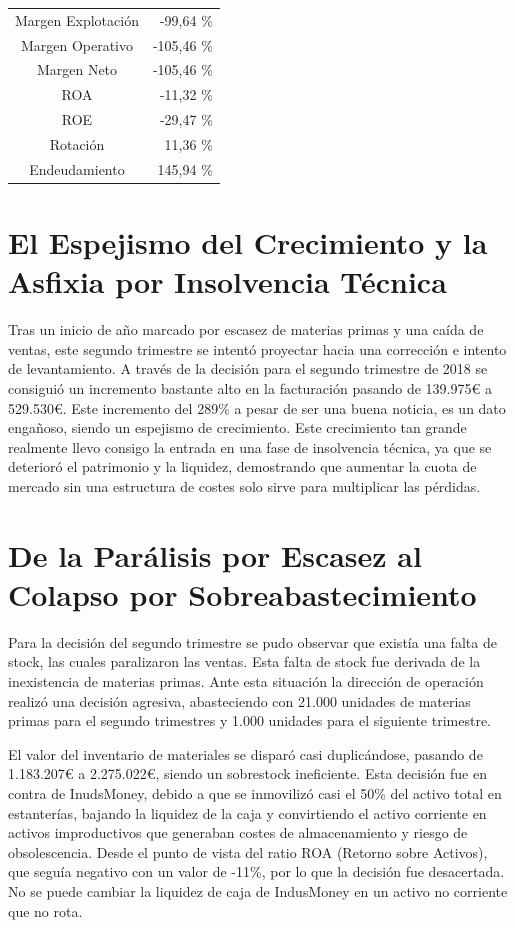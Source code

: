 \begin{table}[h]
    \centering
    \begin{tabular}{|c|r|}
        \hline
        Margen Explotación  & -99,64 \% \\
        Margen Operativo    & -105,46 \% \\
        Margen Neto         & -105,46 \% \\
        ROA                 & -11,32 \% \\
        ROE                 & -29,47 \% \\
        Rotación            & 11,36 \% \\
        Endeudamiento       & 145,94 \% \\
        \hline
    \end{tabular}
\end{table}

\section*{El Espejismo del Crecimiento y la Asfixia por Insolvencia Técnica}
Tras un inicio de año marcado por escasez de materias primas y una caída de ventas, este segundo trimestre se intentó proyectar hacia una corrección e intento de levantamiento. A través de la decisión para el segundo trimestre de 2018 se consiguió un incremento bastante alto en la facturación pasando de 139.975€ a 529.530€. Este incremento del 289\% a pesar de ser una buena noticia, es un dato engañoso, siendo un espejismo de crecimiento. Este crecimiento tan grande realmente llevo consigo la entrada en una fase de insolvencia técnica, ya que se deterioró el patrimonio y la liquidez, demostrando que aumentar la cuota de mercado sin una estructura de costes solo sirve para multiplicar las pérdidas.

\section*{De la Parálisis por Escasez al Colapso por Sobreabastecimiento}
Para la decisión del segundo trimestre se pudo observar que existía una falta de stock, las cuales paralizaron las ventas. Esta falta de stock fue derivada de la inexistencia de materias primas. Ante esta situación la dirección de operación realizó una decisión agresiva, abasteciendo con 21.000 unidades de materias primas para el segundo trimestres y 1.000 unidades para el siguiente trimestre.

El valor del inventario de materiales se disparó casi duplicándose, pasando de 1.183.207€ a 2.275.022€, siendo un sobrestock ineficiente. Esta decisión fue en contra de InudsMoney, debido a que se inmovilizó casi el 50\% del activo total en estanterías, bajando la liquidez de la caja y convirtiendo el activo corriente en activos improductivos que generaban costes de almacenamiento y riesgo de obsolescencia. Desde el punto de vista del ratio ROA (Retorno sobre Activos), que seguía negativo con un valor de -11\%, por lo que la decisión fue desacertada. No se puede cambiar la liquidez de caja de IndusMoney en un activo no corriente que no rota.

